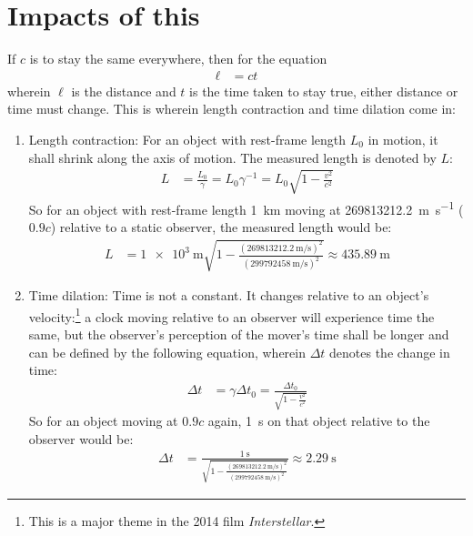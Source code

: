\documentclass[10pt]{article}
\begin{document}
\section{Impacts of this}
If \(c\) is to stay the same everywhere, then for the equation
\begin{align}
    \ell &= ct
\end{align}
wherein \(\ell\) is the distance and \(t\) is the time taken to stay true, either distance or time must change. This is wherein length contraction and time dilation come in:
\begin{enumerate}
    \item Length contraction: For an object with rest-frame length \(L_0\) in motion, it shall shrink along the axis of motion. The measured length is denoted by \(L\):
    \begin{align}
        L &= \frac{L_0}{\gamma} = L_0\gamma^{-1} = L_0\sqrt{1 - \frac{v^2}{c^2}}
    \end{align}
    So for an object with rest-frame length \qty{1}{\kilo\metre} moving at \qty{269 813 212.2}{\metre\per\second} (\(0.9c\)) relative to a static observer, the measured length would be:
    \begin{align}
        L &= \qty{1e3}{\metre}\sqrt{1 - \frac{(\qty{269 813 212.2}{\metre\per\second})^2}{(\qty{299 792 458}{\metre\per\second})^2}} \approx \qty{435.89}{\metre}
    \end{align}
    \item Time dilation: Time is not a constant. It changes relative to an object's velocity:\footnote{This is a major theme in the 2014 film \textit{Interstellar}.} a clock moving relative to an observer will experience time the same, but the observer's perception of the mover's time shall be longer and can be defined by the following equation, wherein \(\Delta t\) denotes the change in time:
    \begin{align}
        \Delta t &= \gamma\Delta t_0 = \frac{\Delta t_0}{\sqrt{1 - \frac{v^2}{c^2}}}
    \end{align}
    So for an object moving at \(0.9c\) again, \qty{1}{\second} on that object relative to the observer would be:
    \begin{align}
        \Delta t &= \frac{\qty{1}{\second}}{\sqrt{1 - \frac{(\qty{269 813 212.2}{\metre\per\second})^2}{(\qty{299 792 458}{\metre\per\second})^2}}} \approx \qty{2.29}{\second}
    \end{align}
\end{enumerate}
\end{document}
